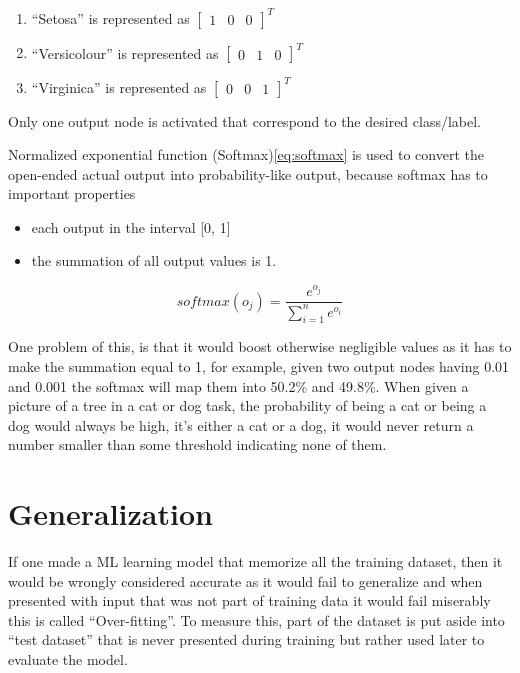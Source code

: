 \begin{enumerate}
\item ``Setosa'' is represented as \( \begin{bmatrix}1 & 0 & 0\end{bmatrix}^T \)
\item ``Versicolour'' is represented as \( \begin{bmatrix}0 & 1 & 0\end{bmatrix}^T \)
\item ``Virginica'' is represented as \( \begin{bmatrix}0 & 0 & 1\end{bmatrix}^T \)
\end{enumerate}

Only one output node is activated that correspond to the desired class/label.

Normalized exponential function (Softmax)\ref{eq:softmax} is used to convert the open-ended actual output
into probability-like output, because softmax has to important properties\autocite{nasrabadi2007pattern}

\begin{itemize}
\item each output in the interval [0, 1]
\item the summation of all output values is 1.
\end{itemize}

\begin{equation}
softmax(o_j) = \frac{e^{o_j}}{ \sum\limits_{i=1}^n e^{o_i} }
\label{eq:softmax}
\end{equation}

One problem of this, is that it would boost otherwise negligible values as it has to make the summation equal to 1,
for example, given two output nodes having 0.01 and 0.001 the softmax will map them into 50.2\% and 49.8\%.
When given a picture of a tree in a cat or dog task, the probability of being a cat or being a dog
would always be high, it's either a cat or a dog, it would never return a number smaller than some threshold
indicating none of them.

\section{Generalization}

If one made a ML learning model that memorize all the training dataset,
then it would be wrongly considered accurate as it would fail to generalize
and when presented with input that was not part of training data it would fail miserably
this is called ``Over-fitting''.
To measure this, part of the dataset is put aside into ``test dataset''
that is never presented during training but rather used later to evaluate the model.

